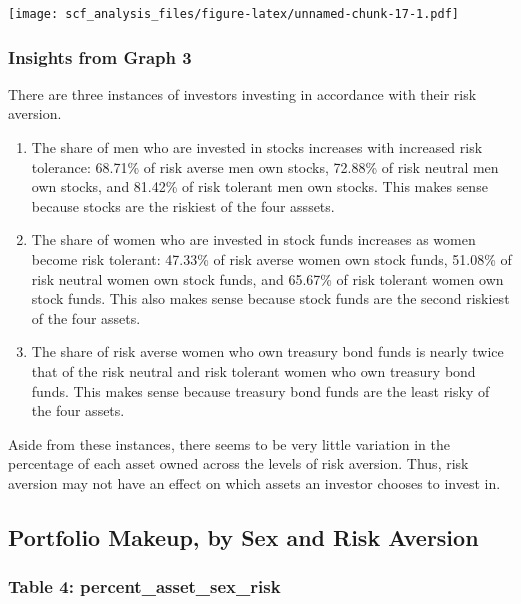 \documentclass[
]{article}
\begin{document}
\texttt{[image: scf\_analysis\_files/figure-latex/unnamed-chunk-17-1.pdf]}

\hypertarget{insights-from-graph-3}{%
\subsubsection{Insights from Graph 3}\label{insights-from-graph-3}}

There are three instances of investors investing in accordance with
their risk aversion.

\begin{enumerate}
\def\labelenumi{\arabic{enumi}.}
\item
  The share of men who are invested in stocks increases with increased
  risk tolerance: 68.71\% of risk averse men own stocks, 72.88\% of risk
  neutral men own stocks, and 81.42\% of risk tolerant men own stocks.
  This makes sense because stocks are the riskiest of the four asssets.
\item
  The share of women who are invested in stock funds increases as women
  become risk tolerant: 47.33\% of risk averse women own stock funds,
  51.08\% of risk neutral women own stock funds, and 65.67\% of risk
  tolerant women own stock funds. This also makes sense because stock
  funds are the second riskiest of the four assets.
\item
  The share of risk averse women who own treasury bond funds is nearly
  twice that of the risk neutral and risk tolerant women who own
  treasury bond funds. This makes sense because treasury bond funds are
  the least risky of the four assets.
\end{enumerate}

Aside from these instances, there seems to be very little variation in
the percentage of each asset owned across the levels of risk aversion.
Thus, risk aversion may not have an effect on which assets an investor
chooses to invest in.

\hypertarget{portfolio-makeup-by-sex-and-risk-aversion}{%
\subsection{Portfolio Makeup, by Sex and Risk
Aversion}\label{portfolio-makeup-by-sex-and-risk-aversion}}

\hypertarget{table-4-percent_asset_sex_risk}{%
\subsubsection{Table 4:
percent\_asset\_sex\_risk}\label{table-4-percent_asset_sex_risk}}
\end{document}
